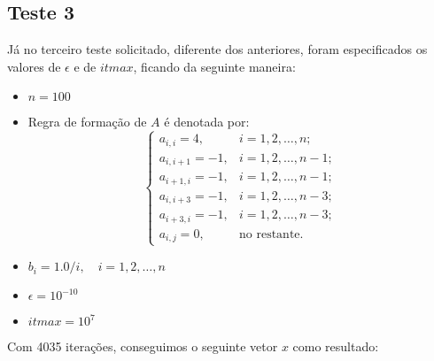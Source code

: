 \subsection{Teste 3}
Já no terceiro teste solicitado, diferente dos anteriores, foram especificados
os valores de \(\epsilon\) e de \(itmax\), ficando da seguinte maneira:

	\begin{itemize}
		\item \(n = 100\)
		\item Regra de formação de \(A\) é denotada por:
		\[
			\begin{cases}
				a_{i,i} = 4,	& i = 1, 2, \ldots, n;\\
				a_{i,i+1} = -1,	& i = 1, 2, \ldots, n-1;\\
				a_{i+1,i} = -1,	& i = 1, 2, \ldots, n-1;\\
				a_{i,i+3} = -1,	& i = 1, 2, \ldots, n-3;\\
				a_{i+3,i} = -1,	& i = 1, 2, \ldots, n-3;\\
				a_{i,j} = 0,	& \mbox{no restante.}
			\end{cases}
		\]
		\item \(b_{i} = 1.0/i, \quad i = 1, 2, \ldots, n\)
		\item \(\epsilon = 10^{-10}\)
		\item \(itmax = 10^{7}\)
	\end{itemize}
Com 4035 iterações, conseguimos o seguinte vetor \(x\) como resultado:
